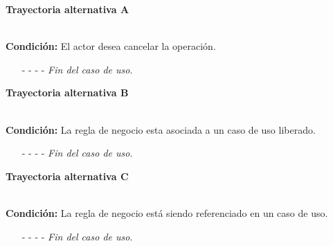 \hypertarget{CU8-3:TAA}{\textbf{Trayectoria alternativa A}}\\
\noindent \textbf{Condición:} El actor desea cancelar la operación.
\begin{enumerate}
	\UCpaso[\UCactor] Solicita cancelar la operación oprimiendo el botón  del mensaje emergente .
	\UCpaso[\UCsist] Muestra la pantalla .
	\item[- -] - - {\em {Fin del caso de uso}}.%
\end{enumerate}	
\hypertarget{CU8-3:TAB}{\textbf{Trayectoria alternativa B}}\\
\noindent \textbf{Condición:} La regla de negocio esta asociada a un caso de uso liberado.
\begin{enumerate}
\UCpaso[\UCsist] Oculta el botón \eliminar de la regla de negocio que esta asociada a casos de uso liberados de la pantalla .
	\item[- -] - - {\em {Fin del caso de uso}}.%
\end{enumerate}
\hypertarget{CU8-3:TAC}{\textbf{Trayectoria alternativa C}}\\
\noindent \textbf{Condición:} La regla de negocio está siendo referenciado en un caso de uso.
\begin{enumerate}
	\UCpaso[\UCsist] Muestra el mensaje  en la pantalla  en una pantalla emergente con la lista de casos de uso que están referenciando a la entidad.
	\item[- -] - - {\em {Fin del caso de uso}}.%
\end{enumerate}
	

